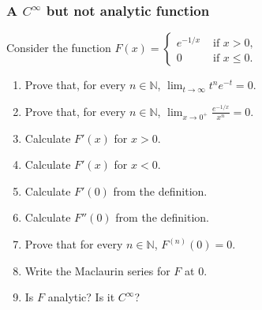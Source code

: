 \begin{frame}[t]
	\fontsize{13}{13}\selectfont
	\frametitle{A $\displaystyle C^{\infty}$ but not analytic function}

	Consider the function $\displaystyle F(x) =
	\begin{cases}
		e^{-1/x} & \text{ if }x >0,     \\
		0        & \text{ if }x \leq 0.
	\end{cases}$

	\begin{enumerate}
		\item Prove that, for every $n \in \mathbb{N}$, $\displaystyle \lim_{t \to
			\infty}t^{n}e^{-t}=0$.

		\item Prove that, for every $n \in \mathbb{N}$, $\displaystyle \lim_{x \to
			0^+}\frac{e^{-1/x}}{x^{n}}=0$.

		\item Calculate $\displaystyle F'(x)$ for $x>0$.

		\item Calculate $\displaystyle F'(x)$ for $x <0$.

		\item Calculate $\displaystyle F'(0)$ from the definition.

		\item Calculate $\displaystyle F''(0)$ from the definition.

		\item Prove that for every $n \in \mathbb{N}$,
			$\displaystyle F^{(n)}(0) = 0$.

		\item Write the Maclaurin series for $F$ at $0$.

		\item Is $F$ analytic? Is it $C^{\infty}$?
	\end{enumerate}
\end{frame}

